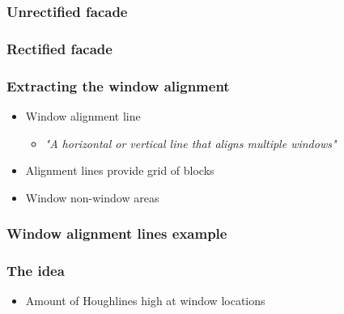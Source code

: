 \documentclass{beamer}
\begin{document}
\frame
{
	\frametitle{Unrectified facade}
}

\frame
{
	\frametitle{Rectified facade}
}


\frame
{
}

\frame
{
}


\frame
{
	\frametitle{Extracting the window alignment}
	\begin{itemize}
	\item <+-| alert@+> Window alignment line
	\begin{itemize}
		\item <+-| alert@+> \emph{"A horizontal or vertical line that aligns multiple windows"}
	\end{itemize}
	\item <+-| alert@+> Alignment lines provide grid of blocks
	\item <+-| alert@+> Window non-window areas
	\end{itemize}
	
}


\frame
{
	\frametitle{Window alignment lines example}
}

\frame
{
	\frametitle{The idea}
	\begin{itemize}
	\item <+-| alert@+> Amount of Houghlines high at window locations
	\end{itemize}
}
\end{document}
